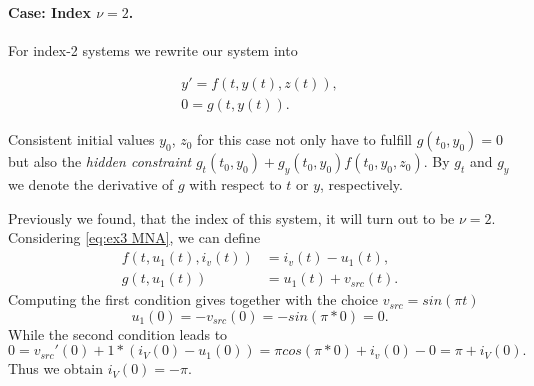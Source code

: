 \paragraph{Case: Index $\nu = 2$.}

For index-2 systems we rewrite our system into

\begin{align*}
	y' = f(t,y(t),z(t)), \\
	0 = g(t,y(t)).
\end{align*}

Consistent initial values $y_0$, $z_0$ for this case not only have to fulfill $g(t_0, y_0) = 0$ but also the \emph{hidden constraint} $g_t(t_0, y_0) + g_y(t_0, y_0)f(t_0, y_0, z_0)$. By $g_t$ and $g_y$ we denote the derivative of $g$ with respect to $t$ or $y$, respectively.


\begin{example3}
	Previously we found, that the index of this system, it will turn out to be $\nu = 2$. Considering \eqref{eq:ex3 MNA}, we can define
	\begin{align*}
		f(t,u_1(t),i_v(t)) &= i_v(t) - u_1(t), \\
		g(t, u_1(t)) &= u_1(t) + v_{src}(t).
	\end{align*}
	Computing the first condition gives together with the choice $v_{src} = sin(\pi t)$
	\begin{displaymath}
		u_1(0) = -v_{src}(0) = -sin(\pi *0) = 0.
	\end{displaymath}
	While the second condition leads to
	\begin{displaymath}
		0 = v_{src}'(0) + 1*(i_V(0)-u_1(0)) = \pi cos(\pi *0) + i_v(0) - 0 = \pi + i_V(0).
	\end{displaymath}
	Thus we obtain $i_V(0) = -\pi$.
\end{example3}
